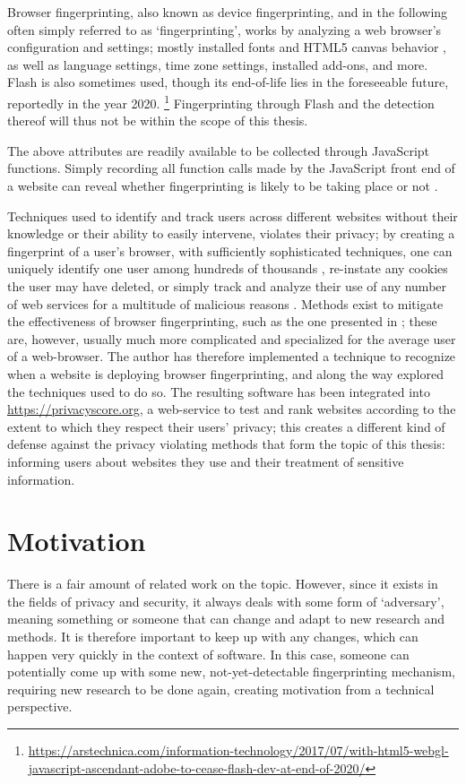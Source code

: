 \documentclass[
    fontsize=12pt,
    headings=small,
    parskip=half,
    bibliography=totoc,
    numbers=noenddot,
    open=any
    ]{scrreprt}
\begin{document}
Browser fingerprinting, also known as device fingerprinting, and in the following often simply referred to as `fingerprinting',
works by analyzing a web browser's configuration and settings; mostly installed fonts and HTML5 canvas behavior
\cite{DBLP:conf/ccs/EnglehardtN16}, as well as
language settings, time zone settings, installed add-ons, and more. Flash is also sometimes used, though
its end-of-life lies in the foreseeable future, reportedly in the year 2020.
\footnote{\url{https://arstechnica.com/information-technology/2017/07/with-html5-webgl-javascript-ascendant-adobe-to-cease-flash-dev-at-end-of-2020/}}
Fingerprinting through Flash and the detection thereof will thus not be within the scope of this thesis.

The above attributes are readily available to be collected through JavaScript functions. Simply recording
all function calls made by the JavaScript front end of a website can reveal whether fingerprinting is likely to
be taking place or not \cite{faiz2014browser, panopticlick}.

Techniques used to identify and track users across different websites without
their knowledge or their ability to easily intervene, violates their privacy; by creating a fingerprint
of a user's browser, with sufficiently sophisticated techniques, one can uniquely identify one user
among hundreds of thousands \cite{am_i_unique}, re-instate any cookies the user may have deleted,
or simply track and analyze their use of any number of web services for a multitude of malicious reasons \cite{eckersley2010unique}.
Methods exist to mitigate the effectiveness of browser fingerprinting, such as the one presented
in \cite{laperdrix2015mitigating};
these are, however, usually much more complicated and specialized for the average user of a web-browser.
The author has therefore implemented a technique to recognize when a website is deploying browser fingerprinting,
and along the way explored the techniques used to do so. The resulting software has been integrated into
\url{https://privacyscore.org}, a web-service to test and rank websites according to the extent to which they
respect their users' privacy; this creates a different kind of defense against the privacy violating
methods that form the topic of this thesis: informing users about websites they use and their treatment of
sensitive information.

\section{Motivation}
There is a fair amount of related work on the topic. However, since it exists in the fields of privacy and security,
it always deals with some form of `adversary', meaning something or someone that can change and adapt to new
research and methods. It is therefore important to keep up with any changes, which can happen very quickly
in the context of software.
In this case, someone can potentially come up with some new, not-yet-detectable fingerprinting mechanism,
requiring new research to be done again, creating motivation from a technical perspective.
\end{document}

